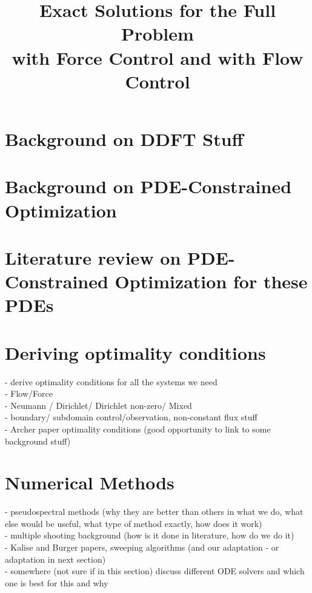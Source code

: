\documentclass[11pt, a4paper]{article}
\title{Exact Solutions for the Full Problem \\with Force Control and with Flow Control}
\date{}
\theoremstyle{definition}
\begin{document}
\section{Background on DDFT Stuff}
\section{Background on PDE-Constrained Optimization}
\section{Literature review on PDE-Constrained Optimization for these PDEs}

\section{Deriving optimality conditions}
- derive optimality conditions for all the systems we need \\
- Flow/Force\\
- Neumann / Dirichlet/ Dirichlet non-zero/ Mixed\\
- boundary/ subdomain control/observation, non-constant flux stuff\\
- Archer paper optimality conditions (good opportunity to link to some background stuff)

\section{Numerical Methods}
- pseudospectral methods (why they are better than others in what we do, what else would be useful, what type of method exactly, how does it work)\\
- multiple shooting background (how is it done in literature, how do we do it)\\
- Kalise and Burger papers, sweeping algorithms (and our adaptation - or adaptation in next section)\\
- somewhere (not sure if in this section) discuss different ODE solvers and which one is best for this and why
\end{document}

